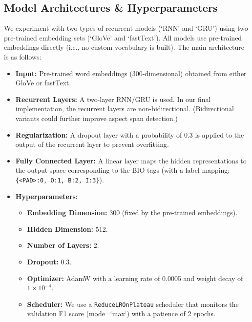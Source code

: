 \documentclass{article}
\begin{document}
\subsection{Model Architectures \& Hyperparameters}
We experiment with two types of recurrent models (`RNN' and `GRU') using two pre-trained embedding sets (`GloVe' and `fastText'). All models use pre-trained embeddings directly (i.e., no custom vocabulary is built). The main architecture is as follows:
\begin{itemize}
    \item \textbf{Input:} Pre-trained word embeddings (300-dimensional) obtained from either GloVe or fastText.
    \item \textbf{Recurrent Layers:} A two-layer RNN/GRU is used. In our final implementation, the recurrent layers are non-bidirectional. (Bidirectional variants could further improve aspect span detection.)
    \item \textbf{Regularization:} A dropout layer with a probability of 0.3 is applied to the output of the recurrent layer to prevent overfitting.
    \item \textbf{Fully Connected Layer:} A linear layer maps the hidden representations to the output space corresponding to the BIO tags (with a label mapping: \texttt{\{<PAD>:0, O:1, B:2, I:3\}}).
    \item \textbf{Hyperparameters:}
    \begin{itemize}
        \item \textbf{Embedding Dimension:} 300 (fixed by the pre-trained embeddings).
        \item \textbf{Hidden Dimension:} 512.
        \item \textbf{Number of Layers:} 2.
        \item \textbf{Dropout:} 0.3.
        \item \textbf{Optimizer:} AdamW with a learning rate of 0.0005 and weight decay of $1 \times 10^{-4}$.
        \item \textbf{Scheduler:} We use a \texttt{ReduceLROnPlateau} scheduler that monitors the validation F1 score (mode=`max`) with a patience of 2 epochs.
    \end{itemize}
\end{itemize}
\end{document}
